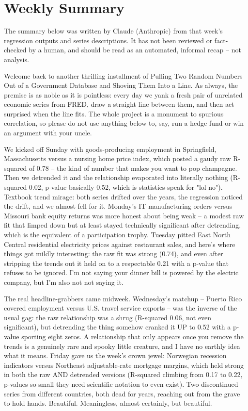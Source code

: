 \section{Weekly Summary}

\begin{tcolorbox}[colback=yellow!10,colframe=black!50,title=AI-Generated Content]
\noindent The summary below was written by Claude (Anthropic) from that week's regression outputs and series descriptions. It has not been reviewed or fact-checked by a human, and should be read as an automated, informal recap -- not analysis.
\end{tcolorbox}

Welcome back to another thrilling installment of Pulling Two Random Numbers Out of a Government Database and Shoving Them Into a Line. As always, the premise is as noble as it is pointless: every day we yank a fresh pair of unrelated economic series from FRED, draw a straight line between them, and then act surprised when the line fits. The whole project is a monument to spurious correlation, so please do not use anything below to, say, run a hedge fund or win an argument with your uncle.

We kicked off Sunday with goods-producing employment in Springfield, Massachusetts versus a nursing home price index, which posted a gaudy raw R-squared of 0.78 -- the kind of number that makes you want to pop champagne. Then we detrended it and the relationship evaporated into literally nothing (R-squared 0.02, p-value basically 0.52, which is statistics-speak for "lol no"). Textbook trend mirage: both series drifted over the years, the regression noticed the drift, and we almost fell for it. Monday's IT manufacturing orders versus Missouri bank equity returns was more honest about being weak -- a modest raw fit that limped down but at least stayed technically significant after detrending, which is the equivalent of a participation trophy. Tuesday pitted East North Central residential electricity prices against restaurant sales, and here's where things got mildly interesting: the raw fit was strong (0.74), and even after stripping the trends out it held on to a respectable 0.21 with a p-value that refuses to be ignored. I'm not saying your dinner bill is powered by the electric company, but I'm also not not saying it.

The real headline-grabbers came midweek. Wednesday's matchup -- Puerto Rico covered employment versus U.S. travel service exports -- was the inverse of the usual gag: the raw relationship was a shrug (R-squared 0.06, not even significant), but detrending the thing somehow cranked it UP to 0.52 with a p-value sporting eight zeros. A relationship that only appears once you remove the trends is a genuinely rare and spooky little creature, and I have no earthly idea what it means. Friday gave us the week's crown jewel: Norwegian recession indicators versus Northeast adjustable-rate mortgage margins, which held strong in both the raw AND detrended versions (R-squared climbing from 0.17 to 0.22, p-values so small they need scientific notation to even exist). Two discontinued series from different countries, both dead for years, reaching out from the grave to hold hands. Beautiful. Meaningless, almost certainly, but beautiful.

